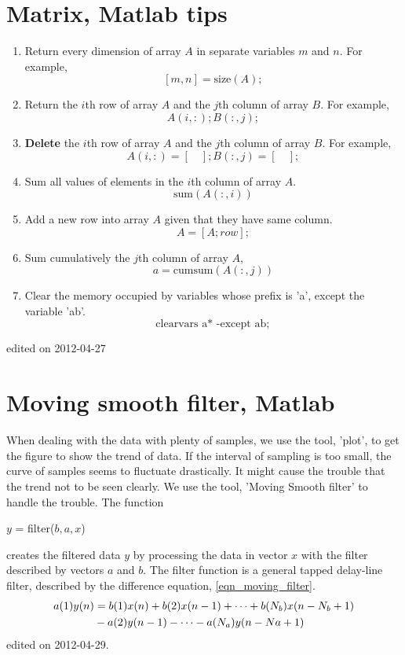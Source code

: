 \section{Matrix, Matlab tips}
\label{sec:matlab}
\begin{enumerate}
\item Return every dimension of array $A$ in separate variables $m$ and $n$.  For example,
    $$[m,n] = \text{size}(A);$$
\item Return the $i$th row of array $A$ and the $j$th column of array $B$. For example,
    $$A(i,:);B(:,j);$$
\item {\bf Delete} the $i$th row of array $A$ and the $j$th column of array $B$. For example,
    $$A(i,:)=[\quad ]; B(:,j)=[\quad ];$$
\item Sum all values of elements in the $i$th column of array $A$. 
    $$\text{sum}(A(:,i))$$
\item Add a new row into array $A$ given that they have same column.
    $$A=[A;row];$$
\item Sum cumulatively the $j$th column of array $A$, 
    $$a = \text{cumsum}(A(:,j))$$
\item Clear the memory occupied by variables whose prefix is 'a', except the variable 'ab'.
    $$\text{clearvars a* -except ab};$$
\end{enumerate}
\hfill {\tiny edited on 2012-04-27}

\section{Moving smooth filter, Matlab}
When dealing with the data with plenty of samples, we use the tool, 'plot', to get the figure to show the trend of data.  If the interval of sampling is too small, the curve of samples seems to fluctuate drastically. It might cause the trouble that the trend not to be seen clearly. We use the tool, 'Moving Smooth filter' to handle the trouble.  
The function 
\begin{center}
$y$ = filter($b, a, x$)
\end{center}
creates the filtered data $y$ by processing the data in vector $x$ with the filter described by vectors $a$ and $b$.
The filter function is a general tapped delay-line filter, described by the difference equation, \autoref{eqn_moving_filter}.
\begin{align}
a(1)y(n) &= b(1)x(n) + b(2)x(n-1) + \cdots + b(N_b)x(n-N_b+1) \notag\\
& -a(2)y(n-1)- \cdots - a(N_a)y(n-Na+1)
\label{eqn_moving_filter}
\end{align}
\hfill {\tiny edited on 2012-04-29.}

